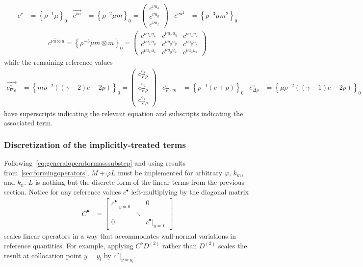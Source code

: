 \documentclass[letterpaper,11pt,nointlimits,reqno,draft]{amsart}
\newcommand{\reference}[1]{\ensuremath{\left\{#1\right\}_{0}}}
\begin{document}
\begin{align}
  c^{\nu} &= \reference{\rho^{-1}\mu}
&
  \overrightarrow{c^{\nu{}u}} &= \reference{\rho^{-2}\mu{}m}
  = \begin{pmatrix} c^{\nu{}u_x} \\ c^{\nu{}u_y} \\ c^{\nu{}u_z} \end{pmatrix}
&
  c^{\nu{}u^2} &= \reference{\rho^{-3}\mu{}m^2}
\end{align}
\begin{align}
   \overleftrightarrow{c^{\nu{}u\otimes{}u}}
  = \reference{\rho^{-3}\mu{}m\otimes{}m}
  = \begin{pmatrix}
   c^{\nu{} u_x u_x} & c^{\nu{} u_x u_y} & c^{\nu{} u_x u_z} \\
   c^{\nu{} u_x u_y} & c^{\nu{} u_y u_y} & c^{\nu{} u_y u_z} \\
   c^{\nu{} u_x u_z} & c^{\nu{} u_y u_z} & c^{\nu{} u_z u_z}
  \end{pmatrix}
\end{align}
while the remaining reference values
\begin{align}
  \overrightarrow{c^{e}_{\nabla\rho}} &= \reference{
        m\rho^{-2}\left(\left(\gamma-2\right)e-2p\right)
  }
  = \begin{pmatrix}
      c^{e_{x}}_{\nabla\rho} \\
      c^{e_{y}}_{\nabla\rho} \\
      c^{e_{z}}_{\nabla\rho}
  \end{pmatrix}
&
  c^{e}_{\nabla\cdot{}m} &= \reference{
        \rho^{-1}\left(e + p\right)
  }
&
  c^{e}_{\Delta\rho} &= \reference{
        \mu\rho^{-2}\left(\left(\gamma-1\right)e-2p\right)
  }
\end{align}
have superscripts indicating the relevant equation and
subscripts indicating the associated term.

\subsubsection{Discretization of the implicitly-treated terms}
\label{sec:discretizationofimplicitterms}

Following~\eqref{eq:generaloperatormasssubstep} and using results
from~\ref{sec:formingoperators}, $M+\varphi{}L$ must be implemented for
arbitrary $\varphi$, $k_m$, and $k_n$. $L$ is nothing but the discrete form of
the linear terms from the previous section.  Notice for any reference values
$c^{\bullet}$ left-multiplying by the diagonal matrix
\begin{align}
  C^{\bullet} &= \begin{bmatrix}
   \left.c^{\bullet}\right|_{y=0} &        & 0 \\
                                  & \ddots &    \\
   0                              &        & \left.c^{\bullet}\right|_{y=L}
   \end{bmatrix}
\end{align}
scales linear operators in a way that accommodates wall-normal variations in
reference quantities.  For example, applying $C^{\nu}D^{(2)}$ rather than
$D^{(2)}$ scales the result at collocation point $y=y_l$ by
$\left.c^{\nu}\right|_{y=y_l}$.
\end{document}
